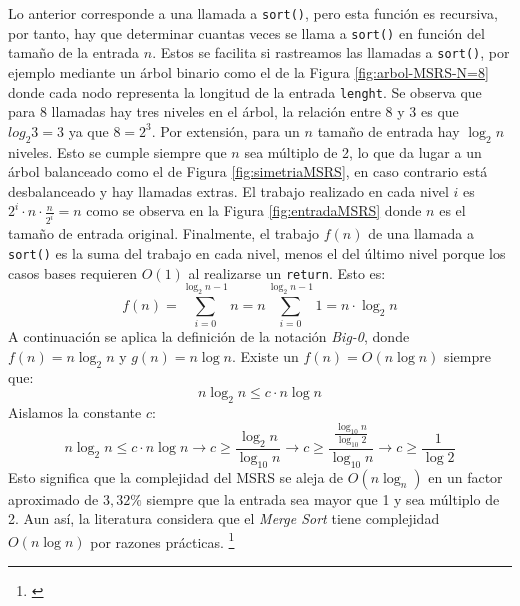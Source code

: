 \documentclass[titlepage]{article}
\begin{document}
Lo anterior corresponde a una llamada a \lstinline{sort()}, pero esta función es recursiva, por tanto, hay que determinar cuantas veces se llama a \lstinline{sort()} en función del tamaño de la entrada \(n\). Estos se facilita si rastreamos las llamadas a \lstinline{sort()}, por ejemplo mediante un árbol binario como el de la Figura \ref{fig:arbol-MSRS-N=8} donde cada nodo representa la longitud de la entrada \lstinline{lenght}. Se observa que para 8 llamadas hay tres niveles en el árbol, la relación entre 8 y 3 es que \(log_{2}{3} = 3\) ya que \(8=2^3\). Por extensión, para un \(n\) tamaño de entrada hay \(\log_{2}{n}\) niveles. Esto se cumple siempre que \(n\) sea múltiplo de 2, lo que da lugar a un árbol balanceado como el de Figura \ref{fig:simetriaMSRS}, en caso contrario está desbalanceado y hay llamadas extras. El trabajo realizado en cada nivel \(i\) es \(2^i\cdot n \cdot \frac{n}{2^i} = n\) como se observa en la Figura \ref{fig:entradaMSRS} donde \(n\) es el tamaño de entrada original. Finalmente, el trabajo \(f(n)\) de una llamada a \lstinline{sort()} es la suma del trabajo en cada nivel, menos el del último nivel porque los casos bases requieren \(O(1)\) al realizarse un \lstinline{return}. Esto es:
\[f(n) = \sum_{i=0}^{\log_{2}{n} -1} {n} = n\sum_{i=0}^{\log_{2}{n} -1} {1} = n\cdot\log_{2}{n}\]
A continuación se aplica la definición de la notación \textit{Big-0}, donde \(f(n)=n\log_{2}{n}\) y \(g(n)=n\log{n}\). Existe un \(f(n)=O(n\log{n})\) siempre que: 
\[n\log_{2}{n} \leq c\cdot n\log{n}\]
Aislamos la constante \(c\):
\[n\log_{2}{n} \leq c\cdot n\log{n} \longrightarrow c \geq \frac{\log_{2}{n}} {\log_{10}{n}} \longrightarrow c \geq \frac{ \frac{\log_{10}{n}} {\log_{10}{2}} } {\log_{10}{n}} \longrightarrow c \geq \frac{1}{\log{2}} \]
Esto significa que la complejidad del MSRS se aleja de \(O(n\log_n)\) en un factor aproximado de \(3,32\%\) siempre que la entrada sea mayor que 1 y sea múltiplo de 2. Aun así, la literatura considera que el \textit{Merge Sort} tiene complejidad \(O(n\log{n})\) por razones prácticas. \footnote{\cite{Sedgewick2003-cd}}
\end{document}
